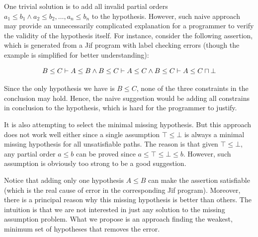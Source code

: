 One trivial solution is to add all invalid partial orders $a_1\leq b_1
\land a_2\leq b_2, \dots, a_n\leq b_n$ to the hypothesis.  However,
such naive approach may provide an unnecessarily complicated
explanation for a programmer to verify the validity of the hypothesis
itself. 
%
For instance, consider the following assertion, which is generated from
a Jif program with label checking errors (though the example is
simplified for better understanding): 

\[B\leq C \vdash A\leq B \land B\leq C \vdash A\leq C \land B\leq C
\vdash A\leq C\sqcap \bot \]

Since the only hypothesis we have is $B\leq C$, none of the three constraints
in the conclusion may hold. Hence, the naive suggestion would be adding all
constrains in conclusion to the hypothesis, which is hard for the
programmer to justify.

It is also attempting to select the minimal missing hypothesis. But
this approach does not work well either since a single assumption
$\top\leq \bot$ is always a minimal missing hypothesis for all
unsatisfiable paths. The reason is that given $\top\leq \bot$, any
partial order $a \leq b$ can be proved since $a\leq \top\leq \bot\leq
b$. However, such assumption is obviously too strong to be a good
suggestion.

Notice that adding only one hypothesis $A\leq B$ can make the
assertion satisfiable (which is the real cause of error in the
corresponding Jif program). Moreover, there is a principal reason why
this missing hypothesis is better than others.
%
The intuition is that we are not interested in just any solution to
the missing assumption problem. What we propose is an approach finding
the weakest, minimum set of hypotheses that removes the error.

% 
% 
% 
% 
